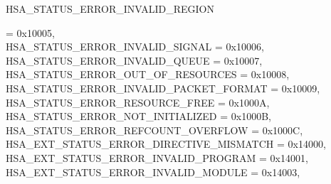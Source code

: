 \documentclass[final,oneside]{book}
\newcommand{\reftyp}[1]{#1}
\newcommand{\refenu}[1]{\reftyp{#1}}
\newenvironment{mylongtable}{\rowcolors{0}{lightgray}{lightgray}\longtable} {
\endlongtable}
\begin{document}
\begin{mylongtable}{@{}p{\textwidth}}
\hspace{1.7em}\hypertarget{group__status_1ggad755322e7ff95456520e8abdbe90d225ad63594ac02edec7ae7aa7722c11afcd9}{\refenu{HSA_\-STATUS_\-ERROR_\-INVALID_\-REGION}} = 0x10005,\\
\hspace{1.7em}\hypertarget{group__status_1ggad755322e7ff95456520e8abdbe90d225a7b4c8c0d4c99a1fe966abc2d39b575fe}{\refenu{HSA_\-STATUS_\-ERROR_\-INVALID_\-SIGNAL}} = 0x10006,\\
\hspace{1.7em}\hypertarget{group__status_1ggad755322e7ff95456520e8abdbe90d225aa3c762eb6a61b358702b45259d1686c4}{\refenu{HSA_\-STATUS_\-ERROR_\-INVALID_\-QUEUE}} = 0x10007,\\
\hspace{1.7em}\hypertarget{group__status_1ggad755322e7ff95456520e8abdbe90d225a1a77fcf36d0d140874c4361ab093eff7}{\refenu{HSA_\-STATUS_\-ERROR_\-OUT_\-OF_\-RESOURCES}} = 0x10008,\\
\hspace{1.7em}\hypertarget{group__status_1ggad755322e7ff95456520e8abdbe90d225a3fad45f72111eb99de5d8daef26c372c}{\refenu{HSA_\-STATUS_\-ERROR_\-INVALID_\-PACKET_\-FORMAT}} = 0x10009,\\
\hspace{1.7em}\hypertarget{group__status_1ggad755322e7ff95456520e8abdbe90d225a6406af88203fcbec4179fbb71cc66b65}{\refenu{HSA_\-STATUS_\-ERROR_\-RESOURCE_\-FREE}} = 0x1000A,\\
\hspace{1.7em}\hypertarget{group__status_1ggad755322e7ff95456520e8abdbe90d225a34ea59ade5bfce95eee935238a99f5b5}{\refenu{HSA_\-STATUS_\-ERROR_\-NOT_\-INITIALIZED}} = 0x1000B,\\
\hspace{1.7em}\hypertarget{group__status_1ggad755322e7ff95456520e8abdbe90d225aa9218eed04d1d2ffc5ed8f33f2cd1c9b}{\refenu{HSA_\-STATUS_\-ERROR_\-REFCOUNT_\-OVERFLOW}} = 0x1000C,\\
\hspace{1.7em}\hypertarget{group__status_1ggad755322e7ff95456520e8abdbe90d225ae16bcc443d027a0b880fd58f0443227b}{\refenu{HSA_\-EXT_\-STATUS_\-ERROR_\-DIRECTIVE_\-MISMATCH}} = 0x14000,\\
\hspace{1.7em}\hypertarget{group__status_1ggad755322e7ff95456520e8abdbe90d225a058105c75cdda59126637b8c5c0d893e}{\refenu{HSA_\-EXT_\-STATUS_\-ERROR_\-INVALID_\-PROGRAM}} = 0x14001,\\
\hspace{1.7em}\hypertarget{group__status_1ggad755322e7ff95456520e8abdbe90d225a159ae50ee80394dd6e051f623834ae9c}{\refenu{HSA_\-EXT_\-STATUS_\-ERROR_\-INVALID_\-MODULE}} = 0x14003,\\

\end{mylongtable}
\end{document}
